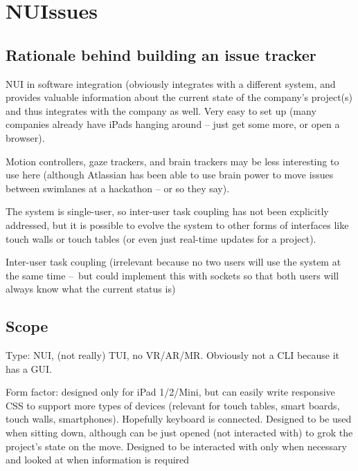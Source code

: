 \section{NUIssues}

\subsection{Rationale behind building an issue tracker}

NUI in software integration (obviously integrates with a different system, and provides valuable information about the current state of the company's project(s) and thus integrates with the company as well. Very easy to set up (many companies already have iPads hanging around – just get some more, or open a browser).

Motion controllers, gaze trackers, and brain trackers may be less interesting to use here (although Atlassian has been able to use brain power to move issues between swimlanes at a hackathon – or so they say).

The system is single-user, so inter-user task coupling has not been explicitly addressed, but it is possible to evolve the system to other forms of interfaces like touch walls or touch tables (or even just real-time updates for a project).

Inter-user task coupling (irrelevant because no two users will use the system at the same time – but could implement this with sockets so that both users will always know what the current status is)



\subsection{Scope}

Type: NUI, (not really) TUI, no VR/AR/MR. Obviously not a CLI because it has a GUI.

Form factor: designed only for iPad 1/2/Mini, but can easily write responsive CSS to support more types of devices (relevant for touch tables, smart boards, touch walls, smartphones). Hopefully keyboard is connected. Designed to be used when sitting down, although can be just opened (not interacted with) to grok the project's state on the move. Designed to be interacted with only when necessary and looked at when information is required

